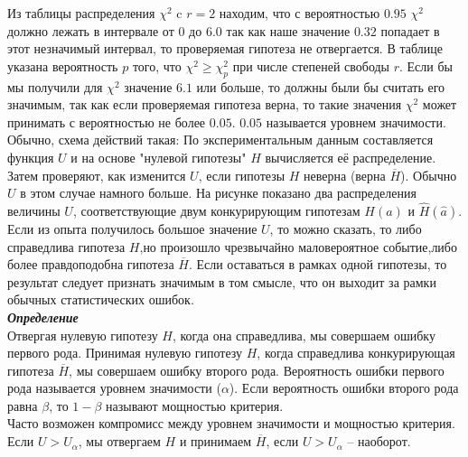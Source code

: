 \documentclass[russian, 12pt, fleqn]{article}
\begin{document}
Из таблицы распределения $\chi^2$ c $r=2$ находим, что с вероятностью $0.95$ $\chi^2$ должно лежать в интервале от $0$ до $6.0$ так  как наше значение  $0.32$ попадает в этот незначимый интервал, то проверяемая гипотеза не отвергается.
В таблице указана вероятность $p$ того, что $\chi^2 \geq \chi^2_p$ при  числе степеней свободы $r$.
Если бы мы получили для $\chi^2$ значение $6.1$ или больше, то должны были бы считать  его значимым, так как если проверяемая гипотеза верна, то такие значения $\chi^2$ может принимать с вероятностью не более $0.05$. $0.05$ называется уровнем значимости.
Обычно, схема действий такая: По экспериментальным данным составляется функция $U$ и на основе "нулевой гипотезы" $H$ вычисляется её распределение. Затем проверяют, как изменится $U$, если гипотезы $H$ неверна (верна $\overline{H}$).
Обычно $U$ в этом случае намного больше. На рисунке показано два распределения величины $U$, соответствующие двум конкурирующим гипотезам $H(a)$ и $\hat{H}(\hat{a})$. Если из опыта получилось большое значение $U$, то можно сказать, то либо справедлива гипотеза $H$,но произошло чрезвычайно маловероятное событие,либо более правдоподобна гипотеза $\overline{H}$. Если оставаться в рамках одной гипотезы, то результат следует признать значимым в том смысле, что он выходит за рамки обычных статистических ошибок.\\
\textit{\textbf{Определение}}\\
Отвергая нулевую гипотезу $H$, когда она справедлива, мы совершаем ошибку первого рода. Принимая нулевую гипотезу $H$, когда справедлива конкурирующая гипотеза 
 $\overline{H}$, мы совершаем ошибку второго рода. Вероятность ошибки первого рода называется уровнем значимости ($\alpha$). Если вероятность ошибки второго рода равна $\beta$, то $1 - \beta$ называют мощностью критерия.\\
Часто возможен компромисс между уровнем значимости и мощностью критерия. Если $U>U_{\alpha}$, мы отвергаем $H$ и принимаем $\overline{H}$, если $U>U_{\alpha}$ -- наоборот.
\end{document}
